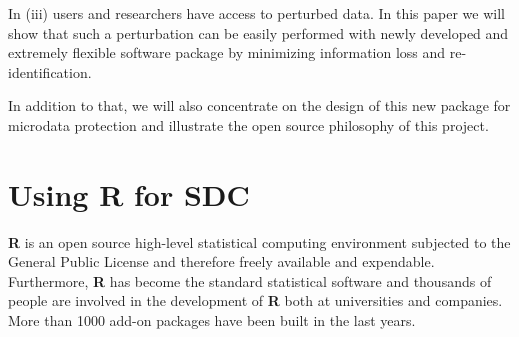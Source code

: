 \documentclass[12pt]{article}
\begin{document}
In (iii) users and researchers have access to perturbed data. In this paper we will show that such a perturbation can be easily performed with newly developed and extremely flexible software package by minimizing information loss and re-identification. 

In addition to that, we will also concentrate on the design of this new package for microdata protection and illustrate the open source philosophy of this project.
 


\section{Using {\bf R} for SDC}

{\bf R} \cite{R07} is an open source high-level statistical computing environment subjected to the General Public License and therefore freely available and expendable. Furthermore, {\bf R} has become the standard statistical software and thousands of people are involved in the development of {\bf R} both at universities and companies. More than 1000 add-on packages have been built in the last years.
\end{document}
